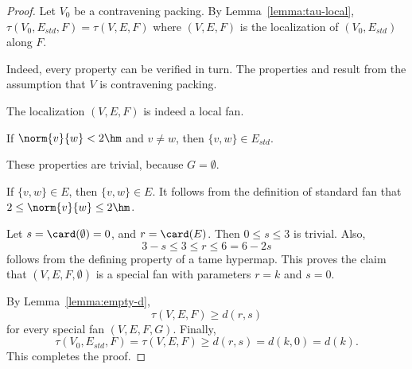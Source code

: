 \begin{proof}
  Let $V_0$ be a contravening packing.  By
  Lemma~\ref{lemma:tau-local}, $\tau(V_0,E_{std},F)=\tau(V,E,F)$ where
  $(V,E,F)$ is the localization of $(V_0,E_{std})$ along $F$.

    Indeed,
  every property can be verified in turn.  The properties
   and  result from the assumption that
  $V$ is contravening packing.

  The localization $(V,E,F)$ is indeed a local fan.

 If $\norm{v}{w}<2\hm$ and $v\ne w$, then $\{v,w\}\in
E_{std}$.

  These properties are trivial, because
$G=\emptyset$.

 If $\{v,w\}\in E$, then $\{v,w\}\in E$.  It follows from
the definition of standard fan that $2\le \norm{v}{w}\le 2\hm$.

 Let $s=\card(\emptyset) = 0$, and $r=\card(E)$.  Then
$0\le s\le 3$ is trivial. Also,
\begin{displaymath}3-s \le 3\le r \le 6=6 - 2s\end{displaymath}
follows from the defining property  of a tame
hypermap.  This proves the claim that $(V,E,F,\emptyset)$ is a special
fan with parameters $r=k$ and $s=0$.

By Lemma~\ref{lemma:empty-d}, 
\begin{displaymath}
\tau(V,E,F) \ge d (r,s)
\end{displaymath}
for every special fan $(V,E,F,G)$. 
Finally, 
\begin{displaymath}
\tau(V_0,E_{std},F)=\tau(V,E,F) \ge d(r,s) = d(k,0) = d(k).
\end{displaymath}  
This completes the proof.
\end{proof}


